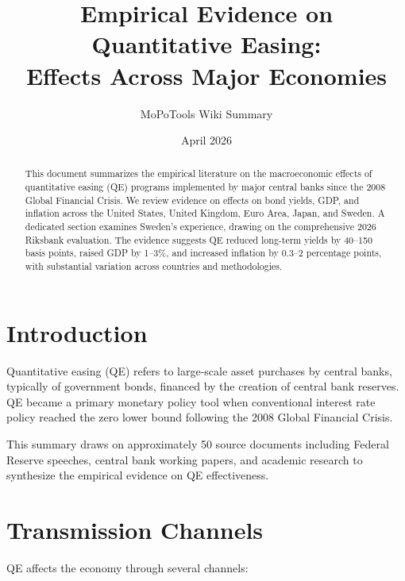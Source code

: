 \documentclass[11pt,a4paper]{article}
\title{\textbf{Empirical Evidence on Quantitative Easing:\\Effects Across Major Economies}}
\author{MoPoTools Wiki Summary}
\date{April 2026}
\begin{document}
\maketitle

\begin{abstract}
This document summarizes the empirical literature on the macroeconomic effects of quantitative easing (QE) programs implemented by major central banks since the 2008 Global Financial Crisis. We review evidence on effects on bond yields, GDP, and inflation across the United States, United Kingdom, Euro Area, Japan, and Sweden. A dedicated section examines Sweden's experience, drawing on the comprehensive 2026 Riksbank evaluation. The evidence suggests QE reduced long-term yields by 40--150 basis points, raised GDP by 1--3\%, and increased inflation by 0.3--2 percentage points, with substantial variation across countries and methodologies.
\end{abstract}

\tableofcontents
\newpage

\section{Introduction}

Quantitative easing (QE) refers to large-scale asset purchases by central banks, typically of government bonds, financed by the creation of central bank reserves. QE became a primary monetary policy tool when conventional interest rate policy reached the zero lower bound following the 2008 Global Financial Crisis.

This summary draws on approximately 50 source documents including Federal Reserve speeches, central bank working papers, and academic research to synthesize the empirical evidence on QE effectiveness.

\section{Transmission Channels}

QE affects the economy through several channels:
\end{document}
